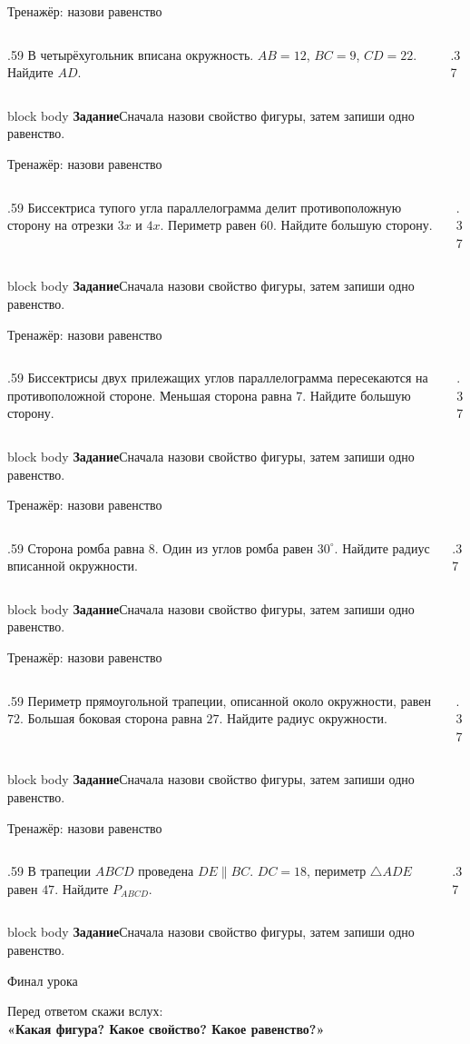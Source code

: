 \documentclass[aspectratio=169,12pt]{beamer}
\newcommand{\support}[2]{%
\vfill
\begin{beamercolorbox}[wd=\linewidth,sep=1.1ex,rounded=true,shadow=false]{block body}
\textbf{#1}\quad #2
\end{beamercolorbox}}
\newcommand{\trainerframe}[2]{%
\begin{frame}{Тренажёр: назови равенство}
\begin{columns}[T,onlytextwidth]
\begin{column}{.59\textwidth}
\vspace{3mm}\Large #1
\end{column}
\begin{column}{.37\textwidth}
\centering\resizebox{\linewidth}{!}{#2}
\end{column}
\end{columns}
\support{Задание}{Сначала назови свойство фигуры, затем запиши одно равенство.}
\end{frame}}
\begin{document}
\trainerframe{В четырёхугольник вписана окружность. \(AB=12\), \(BC=9\),
\(CD=22\). Найдите \(AD\).}{\figTangentialQuad{12}{9}{22}}

\trainerframe{Биссектриса тупого угла параллелограмма делит противоположную
сторону на отрезки \(3x\) и \(4x\). Периметр равен \(60\). Найдите большую сторону.}{\figParallelogramBisector}

\trainerframe{Биссектрисы двух прилежащих углов параллелограмма пересекаются
на противоположной стороне. Меньшая сторона равна \(7\). Найдите большую сторону.}{\figParallelogramTwoBisectors}

\trainerframe{Сторона ромба равна \(8\). Один из углов ромба равен \(30^\circ\).
Найдите радиус вписанной окружности.}{\figRhombusCircle{8}}

\trainerframe{Периметр прямоугольной трапеции, описанной около окружности,
равен \(72\). Большая боковая сторона равна \(27\). Найдите радиус окружности.}{\figRightTangentialTrapezoid{27}}

\trainerframe{В трапеции \(ABCD\) проведена \(DE\parallel BC\). \(DC=18\),
периметр \(\triangle ADE\) равен \(47\). Найдите \(P_{ABCD}\).}{\figTrapezoidParallel{18}{47}}

\begin{frame}{Финал урока}
\begin{center}
\Large Перед ответом скажи вслух:\\[5mm]
\textcolor{lessonblue}{\textbf{«Какая фигура? Какое свойство? Какое равенство?»}}
\end{center}
\end{frame}
\end{document}
